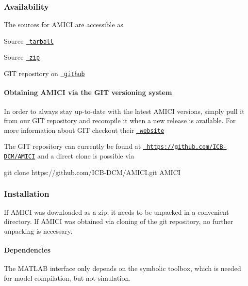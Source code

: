 \subsubsection*{Availability}

The sources for A\+M\+I\+CI are accessible as
\begin{DoxyItemize}
\item Source \href{https://github.com/ICB-DCM/AMICI/tarball/master}{\texttt{ tarball}}
\item Source \href{https://github.com/ICB-DCM/AMICI/zipball/master}{\texttt{ zip}}
\item G\+IT repository on \href{https://github.com/ICB-DCM/AMICI}{\texttt{ github}}
\end{DoxyItemize}

\paragraph*{Obtaining A\+M\+I\+CI via the G\+IT versioning system}

In order to always stay up-\/to-\/date with the latest A\+M\+I\+CI versions, simply pull it from our G\+IT repository and recompile it when a new release is available. For more information about G\+IT checkout their \href{http://git-scm.com/}{\texttt{ website}}

The G\+IT repository can currently be found at \href{https://github.com/ICB-DCM/AMICI}{\texttt{ https\+://github.\+com/\+I\+C\+B-\/\+D\+C\+M/\+A\+M\+I\+CI}} and a direct clone is possible via \begin{DoxyVerb}git clone https://github.com/ICB-DCM/AMICI.git AMICI
\end{DoxyVerb}


\subsubsection*{Installation}

If A\+M\+I\+CI was downloaded as a zip, it needs to be unpacked in a convenient directory. If A\+M\+I\+CI was obtained via cloning of the git repository, no further unpacking is necessary.

\paragraph*{Dependencies}

The M\+A\+T\+L\+AB interface only depends on the symbolic toolbox, which is needed for model compilation, but not simulation.

